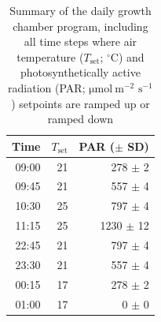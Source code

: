 \newpage
\begin{table}[]
    \centering
    \caption[Summary of the daily growth chamber program]{Summary of the daily growth chamber program, including all time steps where air temperature ($T_\mathrm{set}$; $^{\circ}$C) and photosynthetically active radiation (PAR; $\mathrm{\mu mol\ m^{-2}}$ $\mathrm{{s}^{-1}}$) setpoints are ramped up or ramped down}
    \label{table:tab.d2}
    \begin{tabular}{p{1cm}p{1.1cm}p{2.5cm}}
        \hline
        \multicolumn{1}{r}{Time}  & \multicolumn{1}{r}{$T_\mathrm{set}$}   & \multicolumn{1}{r}{PAR ($\pm$ SD)} \\
        \hline
        \multicolumn{1}{r}{09:00} & \multicolumn{1}{r}{21}      & \multicolumn{1}{r}{278 $\pm$ 2}     \\
        \multicolumn{1}{r}{09:45} & \multicolumn{1}{r}{21}      & \multicolumn{1}{r}{557 $\pm$ 4}    \\
        \multicolumn{1}{r}{10:30} & \multicolumn{1}{r}{25}      & \multicolumn{1}{r}{797 $\pm$ 4}    \\
        \multicolumn{1}{r}{11:15} & \multicolumn{1}{r}{25}      & \multicolumn{1}{r}{1230 $\pm$ 12}    \\
        \multicolumn{1}{r}{22:45} & \multicolumn{1}{r}{21}      & \multicolumn{1}{r}{797 $\pm$ 4}    \\
        \multicolumn{1}{r}{23:30} & \multicolumn{1}{r}{21}      & \multicolumn{1}{r}{557 $\pm$ 4}    \\
        \multicolumn{1}{r}{00:15} & \multicolumn{1}{r}{17}      & \multicolumn{1}{r}{278 $\pm$ 2}     \\
        \multicolumn{1}{r}{01:00} & \multicolumn{1}{r}{17}      & \multicolumn{1}{r}{0 $\pm$ 0}      \\
        \hline      
    \end{tabular}%
\end{table}
\clearpage


